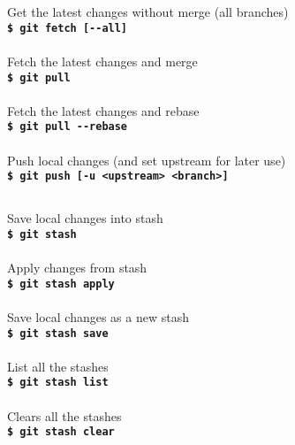 \documentclass[12pt,a3paper,margin=4pt,landscape]{article}
\newcommand{\cmd}[2]{
	#1\\
	\texttt{\textbf{\$ git #2}}\\
	\\
}
\newcommand{\cmdnoline}[2]{
	#1\\
	\texttt{\textbf{\$ git #2}}
}
\newcommand{\sect}[2]{
	\section*{\color{#1}{#2}}
}
\begin{document}
\begin{multicols}{4}


\sect{Orange}{Synchronize}

\cmd{Get the latest changes without merge (all branches)}{fetch [-{}-all]}
\cmd{Fetch the latest changes and merge}{pull}
\cmd{Fetch the latest changes and rebase}{pull -{}-rebase}
\cmdnoline{Push local changes (and set upstream for later use)}{push [-u <upstream> <branch>]}

\begin{adjustwidth}{0.5\columnwidth}{0pt}
\sect{BrickRed}{Stash}
\cmd{Save local changes into stash}{stash}
\cmd{Apply changes from stash}{stash apply}
\cmd{Save local changes as a new stash}{stash save}
\cmd{List all the stashes}{stash list}
\cmd{Clears all the stashes}{stash clear}
\end{adjustwidth}


\end{multicols}
\end{document}
